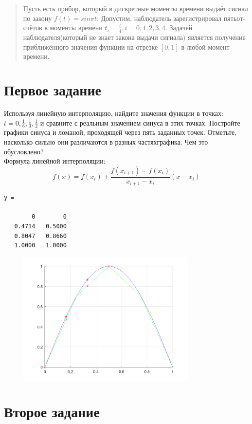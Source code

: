 \maketitle
\tableofcontents
\newpage

\begin{otherlanguage}{russian}
  \begin{abstract}
    Пусть есть прибор, который в дискретные моменты времени выдаёт сигнал по закону $f(t) = sin \pi t$. Допустим, наблюдатель зарегистрировал пятьотсчётов в моменты времени $t_{i} = \frac{i}{4}, i = 0, 1, 2, 3, 4$. Задачей наблюдателя(который не знает закона выдачи сигнала) является получение приближённого значения функции на отрезке $[0, 1]$ в любой момент времени.
  \end{abstract}
\end{otherlanguage}

\section{Первое задание}

Используя линейную интерполяцию, найдите значения функции в точках: $t = 0, \frac{1}{6}, \frac{1}{3}, \frac{1}{2}$ и сравните с реальным значением синуса в этих точках. Постройте графики синуса и ломаной, проходящей через пять заданных точек. Отметьте, насколько сильно они различаются в разных частяхграфика. Чем это обусловлено?\\[5mm]

Формула линейной интерполяции:
\[
  f(x) = f(x_{i}) + \frac{f(x_{i+1}) - f(x_{i})}{x_{i+1} - x_{i}}(x - x_{i})
\]


\begin{lstlisting}[backgroundcolor=\color{lime}]
  y =

        0        0
   0.4714   0.5000
   0.8047   0.8660
   1.0000   1.0000
 \end{lstlisting}

\begin{figure}[h]
  \centering
  \includegraphics[width=0.8\textwidth]{images/first_task_1.png}
\end{figure}

\section{Второе задание}

